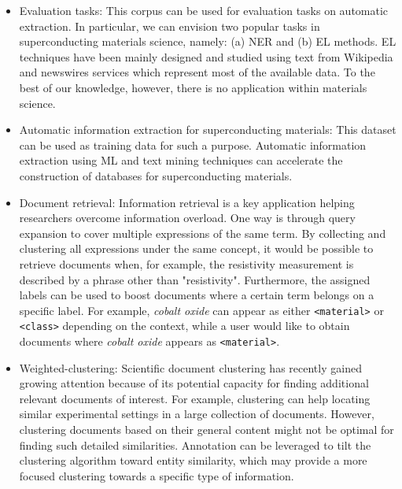 \begin{itemize}
    \item Evaluation tasks: This corpus can be used for evaluation tasks on automatic extraction. In particular, we can envision two popular tasks in superconducting materials science, namely: (a) NER and (b) EL methods. EL techniques have been mainly designed and studied using text from Wikipedia and newswires services which represent most of the available data. 
    To the best of our knowledge, however, there is no application within materials science.
    \item Automatic information extraction for superconducting materials: This dataset can be used as training data for such a purpose. 
    Automatic information extraction using ML and text mining techniques can accelerate the construction of databases for superconducting materials.
    \item Document retrieval: Information retrieval is a key application helping researchers overcome information overload.
    One way is through query expansion to cover multiple expressions of the same term. 
    By collecting and clustering all expressions under the same concept, it would be possible to retrieve documents when, for example, the resistivity measurement is described by a phrase other than "resistivity". 
    Furthermore, the assigned labels can be used to boost documents where a certain term belongs on a specific label. 
    For example, \textit{cobalt oxide} can appear as either \texttt{<material>} or \texttt{<class>} depending on the context, while a user would like to obtain documents where \textit{cobalt oxide} appears as \texttt{<material>}.
    \item Weighted-clustering: Scientific document clustering has recently gained growing attention because of its potential capacity for finding additional relevant documents of interest.
    For example, clustering can help locating similar experimental settings in a large collection of documents. However, clustering documents based on their general content might not be optimal for finding such detailed similarities.
    Annotation can be leveraged to tilt the clustering algorithm toward entity similarity, which may provide a more focused clustering towards a specific type of information.
\end{itemize}

\label{sec:technical-validation}
